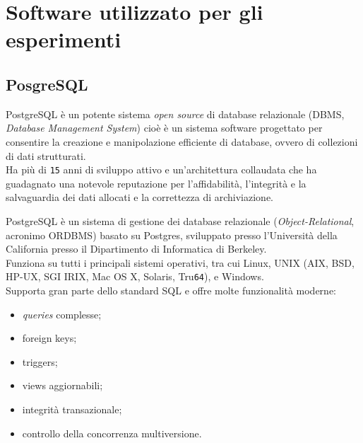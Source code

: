 \item
\section{Software utilizzato per gli esperimenti}
\item
\subsection{PosgreSQL}
PostgreSQL \`{e} un potente sistema \textit{open source} di database relazionale (DBMS, \textit{Database Management System}) cio\`{e} \`{e} un sistema software progettato per consentire la creazione e manipolazione efficiente di database, ovvero di collezioni di dati strutturati.\\ 
Ha pi\`{u} di \verb"15" anni di sviluppo attivo e un'architettura collaudata che ha guadagnato una notevole reputazione per l'affidabilit\`{a}, l'integrit\`{a} e la salvaguardia dei dati allocati e la correttezza di archiviazione.

PostgreSQL \`{e} un sistema di gestione dei database relazionale (\textit{Object-Relational}, acronimo ORDBMS) basato su Postgres, sviluppato presso l'Universit\`{a} della California presso il Dipartimento di Informatica di Berkeley\cite{etichetta15}.\\
Funziona su tutti i principali sistemi operativi, tra cui Linux, UNIX (AIX, BSD, HP-UX, SGI IRIX, Mac OS X, Solaris, Tru\verb"64"), e Windows\cite{etichetta15}.\\

Supporta gran parte dello standard SQL e offre molte funzionalit\`{a} moderne:
\begin{itemize}
\item 
\textit{queries} complesse;
\item
foreign keys;
\item
triggers;
\item
views aggiornabili;
\item
integrit\`{a} transazionale;
\item
controllo della concorrenza multiversione.
\end{itemize}


